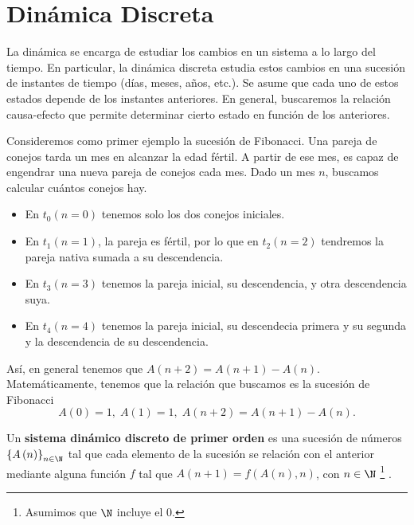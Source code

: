 \chapter{Dinámica Discreta}
La dinámica se encarga de estudiar los cambios en un sistema a lo largo del tiempo. En particular, la dinámica discreta estudia estos cambios en una sucesión de instantes de tiempo (días, meses, años, etc.). Se asume que cada uno de estos estados depende de los instantes anteriores. En general, buscaremos la relación causa-efecto que permite determinar cierto estado en función de los anteriores.
\begin{eg}
\normalfont Consideremos como primer ejemplo la sucesión de Fibonacci. Una pareja de conejos tarda un mes en alcanzar la edad fértil. A partir de ese mes, es capaz de engendrar una nueva pareja de conejos cada mes. Dado un mes $\displaystyle n $, buscamos calcular cuántos conejos hay.
\begin{itemize}
\item En $\displaystyle t_{0} \left(n = 0\right) $ tenemos solo los dos conejos iniciales. 
\item En $\displaystyle t_{1} \left(n = 1\right) $, la pareja es fértil, por lo que en $\displaystyle t_{2} \left(n = 2\right)$ tendremos la pareja nativa sumada a su descendencia.
\item En $\displaystyle t_{3} \left(n=3\right)$ tenemos la pareja inicial, su descendencia, y otra descendencia suya. 
\item En $\displaystyle t_{4} \left(n = 4\right) $ tenemos la pareja inicial, su descendecia primera y su segunda y la descendencia de su descendencia.
\end{itemize}
Así, en general tenemos que $\displaystyle A\left(n + 2\right) = A\left(n + 1\right) - A\left(n\right) $. Matemáticamente, tenemos que la relación que buscamos es la sucesión de Fibonacci
\[
A\left(0\right) = 1, \; A\left(1\right) = 1, \; A\left(n+2\right) = A\left(n+1\right)-A\left(n\right).\]
\end{eg}
\begin{fdefinition}[]
	\normalfont Un \textbf{sistema dinámico discreto de primer orden} es una sucesión de números $\displaystyle \left\{ A\left(n\right)\right\} _{n\in\N} $ tal que cada elemento de la sucesión se relación con el anterior mediante alguna función $\displaystyle f $ tal que $\displaystyle A\left(n+1\right) = f\left(A\left(n\right),n\right) $, con $\displaystyle n \in \N $ \footnote{Asumimos que $\displaystyle \N $ incluye el 0.} .
\end{fdefinition}
